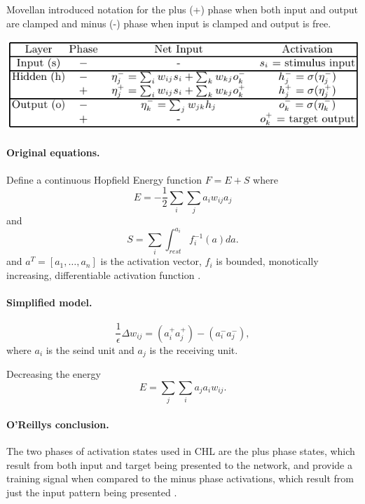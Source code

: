Movellan introduced notation for the plus (+) phase when both input and output are clamped and minus (-) phase when input is clamped and output is free. 

\begin{center} 
\includegraphics{img/table_generec.png} 
\citet{farkas2013bal} 
\end{center} 

\paragraph{Original equations.}
Define a continuous Hopfield Energy function $F = E + S$ where
$$ E = -\frac{1}{2}\sum_i\sum_ja_iw_{ij}a_j$$
and 
$$ S = \sum_i \int_{rest}^{a_i} f_i^{-1}(a)da.$$
and $a^T = [a_1,\ldots,a_n]$ is the activation vector, $f_i$ is bounded, monotically increasing, differentiable activation function \citet{movellan1990contrastive}.

\paragraph{Simplified model.}

$$\frac{1}{\epsilon}\Delta w_{ij} = (a_i^+a_j^+)-(a_i^-a_j^-),$$
where $a_i$ is the seind unit and $a_j$ is the receiving unit. 

Decreasing the energy
$$E = \sum_j\sum_i a_j a_i w_{ij}.$$

\paragraph{O'Reillys conclusion.}

The two phases of activation states used in CHL are the plus phase states, which result from both input
and target being presented to the network, and provide a training signal when compared to the minus phase
activations, which result from just the input pattern being presented \citet{o1996bio}. 

